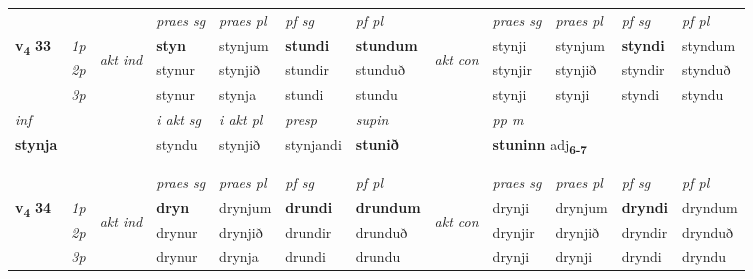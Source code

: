 \begin{longtable}[l]{X>{\footnotesize\itshape}llXXXXlXXXX}
 & &   & \textit{praes sg}  & \textit{praes pl}    & \textit{ pf sg} & \textit{pf pl} & & \textit{praes sg}  & \textit{praes pl}    & \textit{pf sg} & \textit{pf pl }  \\ \cmidrule{4-7} \cmidrule{9-12}
 \multirow{2}{*}{{{\textbf{v{\textsubscript{4}}} \Large{\textbf{33}}}}}  & 1p & \multirow{3}{*}{\begin{turn}{90}\textit{akt ind}\end{turn}} & \textbf{styn} & stynjum & \textbf{stundi} & \textbf{stundum} & \multirow{3}{*}{\begin{turn}{90}\textit{akt con}\end{turn}} &stynji & stynjum & \textbf{styndi} & styndum\\*
 & 2p &  &  stynur  & stynjið & stundir & stunduð & & stynjir & stynjið & styndir & stynduð \\*
 & 3p &  & stynur & stynja & stundi & stundu & & stynji & stynji& styndi & styndu \\*
\cmidrule{4-7} \cmidrule{9-12}

   {\textit{inf}} & &  & \textit{i akt sg} & \textit{i akt pl}   & \textit{presp} & \textit{supin}  && \textit{pp m} \\*
  {\textbf{stynja}} & && styndu  & stynjið   & stynjandi &  \textbf{stunið}  && \multicolumn{2}{l}{\textbf{stuninn} adj\textbf{\textsubscript{6-7}}} \\*

\midrule
   & \\*
  & \\
   \midrule
 & &   & \textit{praes sg}  & \textit{praes pl}    & \textit{ pf sg} & \textit{pf pl} & & \textit{praes sg}  & \textit{praes pl}    & \textit{pf sg} & \textit{pf pl }  \\ \cmidrule{4-7} \cmidrule{9-12}
 \multirow{2}{*}{{{\textbf{v{\textsubscript{4}}} \Large{\textbf{34}}}}}  & 1p & \multirow{3}{*}{\begin{turn}{90}\textit{akt ind}\end{turn}} & \textbf{dryn} & drynjum & \textbf{drundi} & \textbf{drundum} & \multirow{3}{*}{\begin{turn}{90}\textit{akt con}\end{turn}} &drynji & drynjum & \textbf{dryndi} & dryndum\\*
 & 2p &  &  drynur  & drynjið & drundir & drunduð & & drynjir & drynjið & dryndir & drynduð \\*
 & 3p &  & drynur & drynja & drundi & drundu & & drynji & drynji& dryndi & dryndu \\*
\cmidrule{4-7} \cmidrule{9-12}


\end{longtable}
